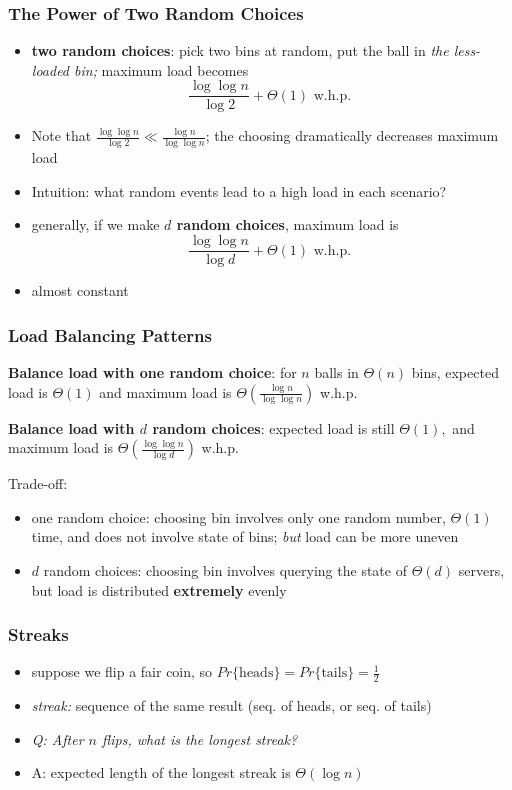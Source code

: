 \documentclass[10pt]{beamer}
\begin{document}
\begin{frame} \frametitle{The Power of Two Random Choices}
\begin{itemize}
  \item \textbf{two random choices}: pick two bins at random, put the ball in
    \emph{the less-loaded bin;} maximum load becomes
    \[ \frac{\log \log n}{\log 2} + \Theta(1) \text{ w.h.p. } \]
  \item Note that $\frac{\log \log n}{\log 2} \ll \frac{\log n}{\log \log n}$; the choosing dramatically decreases maximum load
  \item Intuition: what random events lead to a high load in each scenario?
  \item generally, if we make \textbf{$d$ random choices}, maximum load is
    \[ \frac{\log \log n}{\log d} + \Theta(1) \text { w.h.p. } \]
  \item almost constant
\end{itemize}
\end{frame}

\begin{frame} \frametitle{Load Balancing Patterns}

\textbf{Balance load with one random choice}: for $n$ balls in $\Theta(n)$ bins,
expected load is $\Theta(1)$ and maximum load is $\Theta(\frac{\log n}{\log \log n})$ w.h.p.
\vspace{.5cm}

\textbf{Balance load with $d$ random choices}: expected load is still $\Theta(1),$
and maximum load is $\Theta(\frac{\log \log n}{\log d})$ w.h.p.
\vspace{.5cm}

Trade-off:
\begin{itemize}
  \item one random choice: choosing bin involves only one random number,
  $\Theta(1)$ time, and
    does not involve state of bins; \emph{but} load can be more uneven
  \item $d$ random choices: choosing bin involves querying the state of $\Theta(d)$ servers, but
  load is distributed \textbf{extremely} evenly
\end{itemize}
\end{frame}

\begin{frame} \frametitle{Streaks}
\begin{itemize}
  \item suppose we flip a fair coin, so $Pr\{\text{heads}\} = Pr\{\text{tails}\}=\frac{1}{2}$
  \item \emph{streak:} sequence of the same result (seq. of heads, or seq. of tails)
  \item \emph{Q: After $n$ flips, what is the longest streak?}
  \item A: expected length of the longest streak is $\Theta(\log n)$
\end{itemize}
\end{frame}
\end{document}
